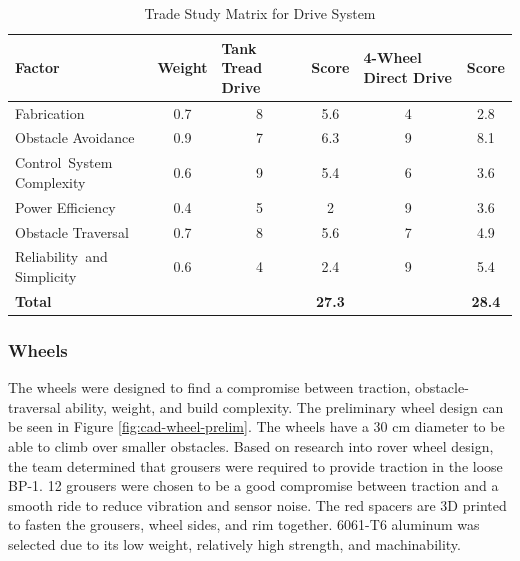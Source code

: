\documentclass[class=article, crop=false]{standalone}
\begin{document}
\FloatBarrier
	\begin{table}[h]
	\footnotesize
	\centering
	\begin{tabular}{ | p{8em} | m{4em} | m{6em} | m{3em} | m{8em} | m{3em} | }
 	\hline
 		\rowcolor[gray]{0.8}
 		\textbf{Factor} &\textbf{Weight} &\textbf{Tank Tread Drive} &\textbf{Score} &\textbf{4-Wheel Direct Drive} &\textbf{Score}  \\ 
 		\hline
		Fabrication                       &  \multicolumn{1}{c|}{0.7}  &  \multicolumn{1}{c|}{8}    &  \multicolumn{1}{c|}{5.6}  &  \multicolumn{1}{c|}{4}    &  \multicolumn{1}{c|}{2.8}   \\ 
 		\hline
 		Obstacle \mbox{Avoidance}         &  \multicolumn{1}{c|}{0.9}  &  \multicolumn{1}{c|}{7}    &  \multicolumn{1}{c|}{6.3}  &  \multicolumn{1}{c|}{9}    &  \multicolumn{1}{c|}{8.1}   \\ 
 		\hline
 		\mbox{Control System} Complexity  &  \multicolumn{1}{c|}{0.6}  &  \multicolumn{1}{c|}{9}    &  \multicolumn{1}{c|}{5.4}  &  \multicolumn{1}{c|}{6}    &  \multicolumn{1}{c|}{3.6}   \\
 		\hline
 		Power \mbox{Efficiency}           &  \multicolumn{1}{c|}{0.4}  &  \multicolumn{1}{c|}{5}    &  \multicolumn{1}{c|}{2}    &  \multicolumn{1}{c|}{9}    &  \multicolumn{1}{c|}{3.6}   \\ 
 		\hline
 		Obstacle \mbox{Traversal}         &  \multicolumn{1}{c|}{0.7}  &  \multicolumn{1}{c|}{8}    &  \multicolumn{1}{c|}{5.6}  &  \multicolumn{1}{c|}{7}    &  \multicolumn{1}{c|}{4.9}   \\
 		\hline
 		\mbox{Reliability and} Simplicity &  \multicolumn{1}{c|}{0.6}  &  \multicolumn{1}{c|}{4}    &  \multicolumn{1}{c|}{2.4}  &  \multicolumn{1}{c|}{9}    &  \multicolumn{1}{c|}{5.4}   \\
 		\hline
 		\rowcolor[gray]{0.9}
 		\textbf{Total}                    &       &       &\multicolumn{1}{c|}{\textbf{27.3}}&       &\multicolumn{1}{c|}{\textbf{28.4}}\\
 		\hline
	\end{tabular}
	\caption{Trade Study Matrix for Drive System }
		\label{table:drive_trade_study}
	\end{table}
	\FloatBarrier
	
	\subsubsection{Wheels}
	The wheels were designed to find a compromise between traction, obstacle-traversal ability, weight, and build complexity. The preliminary wheel design can be seen in Figure \ref{fig:cad-wheel-prelim}. The wheels have a 30 cm diameter to be able to climb over smaller obstacles. Based on research into rover wheel design, the team determined that grousers were required to provide traction in the loose BP-1. 12 grousers were chosen to be a good compromise between traction and a smooth ride to reduce vibration and sensor noise. The red spacers are 3D printed to fasten the grousers, wheel sides, and rim together. 6061-T6 aluminum was selected due to its low weight, relatively high strength, and machinability.
	
\end{document}
